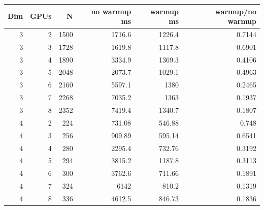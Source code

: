 \documentclass{article}
\begin{document}
\begin{tabular}{rrrrrr}
\toprule
Dim & GPUs & N & no warmup ms & warmup ms & warmup/no warmup\\
\midrule
3 & 2 & 1500 & 1716.6 & 1226.4 & 0.7144\\
3 & 3 & 1728 & 1619.8 & 1117.8 & 0.6901\\
3 & 4 & 1890 & 3334.9 & 1369.3 & 0.4106\\
3 & 5 & 2048 & 2073.7 & 1029.1 & 0.4963\\
3 & 6 & 2160 & 5597.1 & 1380 & 0.2465\\
3 & 7 & 2268 & 7035.2 & 1363 & 0.1937\\
3 & 8 & 2352 & 7419.4 & 1340.7 & 0.1807\\
4 & 2 & 224 & 731.08 & 546.88 & 0.748\\
4 & 3 & 256 & 909.89 & 595.14 & 0.6541\\
4 & 4 & 280 & 2295.4 & 732.76 & 0.3192\\
4 & 5 & 294 & 3815.2 & 1187.8 & 0.3113\\
4 & 6 & 300 & 3762.6 & 711.66 & 0.1891\\
4 & 7 & 324 & 6142 & 810.2 & 0.1319\\
4 & 8 & 336 & 4612.5 & 846.73 & 0.1836\\
\bottomrule
\end{tabular}
\end{document}
